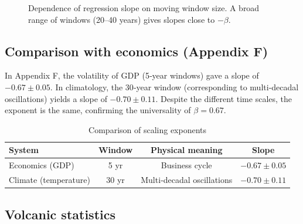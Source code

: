\documentclass[12pt,a4paper]{article}
\newcommand{\be}{\beta}
\begin{document}
	\begin{figure}[htbp]
		\centering
		\caption{Dependence of regression slope on moving window size. A broad range of windows (20–40 years) gives slopes close to \(-\be\).}
		\label{fig:slope_vs_window}
	\end{figure}
	
	\subsection{Comparison with economics (Appendix F)}
	
	In Appendix F, the volatility of GDP (5‑year windows) gave a slope of \(-0.67 \pm 0.05\). In climatology, the 30‑year window (corresponding to multi‑decadal oscillations) yields a slope of \(-0.70 \pm 0.11\). Despite the different time scales, the exponent is the same, confirming the universality of \(\be = 0.67\).
	
	\begin{table}[htbp]
		\centering
		\caption{Comparison of scaling exponents}
		\label{tab:compare}
		\begin{tabular}{@{}lccc@{}}
			\toprule
			System & Window & Physical meaning & Slope \\
			\midrule
			Economics (GDP) & 5 yr & Business cycle & \(-0.67 \pm 0.05\) \\
			Climate (temperature) & 30 yr & Multi‑decadal oscillations & \(-0.70 \pm 0.11\) \\
			\bottomrule
		\end{tabular}
	\end{table}
	
	\subsection{Volcanic statistics}
	
\end{document}
